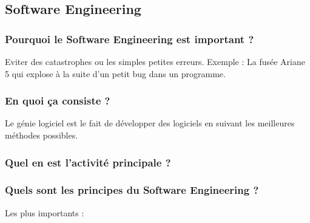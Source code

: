 \subsection{Software Engineering}

\subsubsection{Pourquoi le Software Engineering est important ?}
Eviter des catastrophes ou les simples petites erreurs. Exemple : La fusée Ariane 5 qui explose à la suite d'un petit bug dans un programme.
\subsubsection{En quoi ça consiste ?}
Le génie logiciel est le fait de développer des logiciels en suivant les meilleures méthodes possibles.
\subsubsection{Quel en est l'activité principale ?}
\subsubsection{Quels sont les principes du Software Engineering ?}
Les plus importants :
